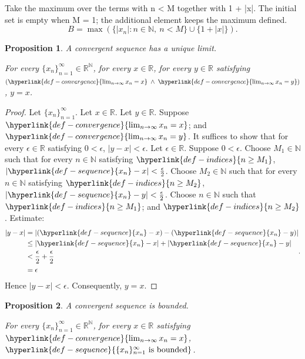 \documentclass[11pt]{article}
\newtheorem{proposition}{Proposition}
\begin{document}
Take the maximum over the terms with n < M together with 1 + |x|. The initial set is empty when M = 1; the additional element keeps the maximum defined.
\[ B=\max\left(\{|x_n|:n\in\mathbb{N},\ n<M\}\cup\{1+|x|\}\right). \]
\begin{proposition}A convergent sequence has a unique limit.

For every $\{x_n\}_{n=1}^{\infty}\in \mathbb{R}^{\mathbb{N}}$, for every $x\in \mathbb{R}$, for every $y\in \mathbb{R}$ satisfying $\left(\hyperlink{def-convergence}{\lim_{n\to\infty} x_n = x} \;\land\; \hyperlink{def-convergence}{\lim_{n\to\infty} x_n = y}\right)$, $y = x$.\end{proposition}
\begin{proof}Let $\{x_n\}_{n=1}^{\infty}$.
Let $x\in \mathbb{R}$.
Let $y\in \mathbb{R}$.
Suppose $\hyperlink{def-convergence}{\lim_{n\to\infty} x_n = x}$; and $\hyperlink{def-convergence}{\lim_{n\to\infty} x_n = y}$.
It suffices to show that for every $\epsilon\in \mathbb{R}$ satisfying $0 < \epsilon$, $\left|y - x\right| < \epsilon$.
Let $\epsilon\in \mathbb{R}$.
Suppose $0 < \epsilon$.
Choose $M_1\in \mathbb{N}$ such that for every $n\in \mathbb{N}$ satisfying $\hyperlink{def-indices}{n\ge M_1}$, $\left|\hyperlink{def-sequence}{x_{n}} - x\right| < \frac{\epsilon}{2}$.
Choose $M_2\in \mathbb{N}$ such that for every $n\in \mathbb{N}$ satisfying $\hyperlink{def-indices}{n\ge M_2}$, $\left|\hyperlink{def-sequence}{x_{n}} - y\right| < \frac{\epsilon}{2}$.
Choose $n\in \mathbb{N}$ such that $\hyperlink{def-indices}{n\ge M_1}$; and $\hyperlink{def-indices}{n\ge M_2}$.
Estimate:
\[ \begin{aligned}\left|y - x\right| &= \left|\left(\hyperlink{def-sequence}{x_{n}} - x\right) - \left(\hyperlink{def-sequence}{x_{n}} - y\right)\right| \\ &\le \left|\hyperlink{def-sequence}{x_{n}} - x\right| + \left|\hyperlink{def-sequence}{x_{n}} - y\right| \\ &< \frac{\epsilon}{2} + \frac{\epsilon}{2} \\ &= \epsilon\end{aligned}. \]
Hence $\left|y - x\right| < \epsilon$.
Consequently, $y = x$.
\end{proof}
\begin{proposition}A convergent sequence is bounded.

For every $\{x_n\}_{n=1}^{\infty}\in \mathbb{R}^{\mathbb{N}}$, for every $x\in \mathbb{R}$ satisfying $\hyperlink{def-convergence}{\lim_{n\to\infty} x_n = x}$, $\hyperlink{def-sequence}{\{x_n\}_{n=1}^{\infty}\text{ is bounded}}$.\end{proposition}
\end{document}
